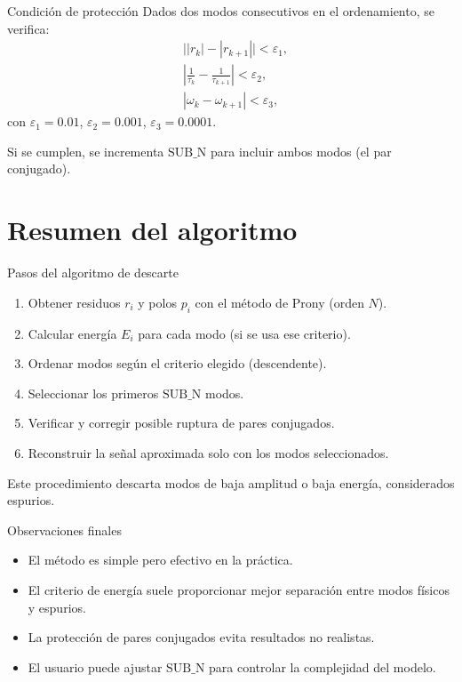 {Condición de protección}
Dados dos modos consecutivos en el ordenamiento, se verifica:
\[
\begin{aligned}
&\bigl||r_k|-|r_{k+1}|\bigr| < \varepsilon_1,\\
&\left|\frac{1}{\tau_k}-\frac{1}{\tau_{k+1}}\right| < \varepsilon_2,\\
&|\omega_k-\omega_{k+1}| < \varepsilon_3,
\end{aligned}
\]
con \(\varepsilon_1=0.01\), \(\varepsilon_2=0.001\), \(\varepsilon_3=0.0001\).

Si se cumplen, se incrementa \(\text{SUB\_N}\) para incluir ambos modos (el par conjugado).

\section{Resumen del algoritmo}

{Pasos del algoritmo de descarte}
\begin{enumerate}
  \item Obtener residuos \(r_i\) y polos \(p_i\) con el método de Prony (orden \(N\)).
  \item Calcular energía \(E_i\) para cada modo (si se usa ese criterio).
  \item Ordenar modos según el criterio elegido (descendente).
  \item Seleccionar los primeros \(\text{SUB\_N}\) modos.
  \item Verificar y corregir posible ruptura de pares conjugados.
  \item Reconstruir la señal aproximada solo con los modos seleccionados.
\end{enumerate}
Este procedimiento descarta modos de baja amplitud o baja energía, considerados espurios.

{Observaciones finales}
\begin{itemize}
  \item El método es simple pero efectivo en la práctica.
  \item El criterio de energía suele proporcionar mejor separación entre modos físicos y espurios.
  \item La protección de pares conjugados evita resultados no realistas.
  \item El usuario puede ajustar \(\text{SUB\_N}\) para controlar la complejidad del modelo.
\end{itemize}

\ThankYouFrame

